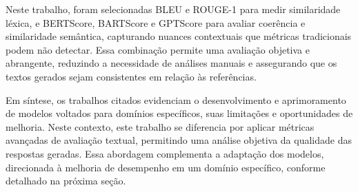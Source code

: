 Neste trabalho, foram selecionadas BLEU e ROUGE-1 para medir similaridade léxica, e BERTScore, BARTScore e GPTScore para avaliar coerência e similaridade semântica, capturando nuances contextuais que métricas tradicionais podem não detectar. Essa combinação permite uma avaliação objetiva e abrangente, reduzindo a necessidade de análises manuais e assegurando que os textos gerados sejam consistentes em relação às referências.

Em síntese, os trabalhos citados evidenciam o desenvolvimento e aprimoramento de modelos voltados para domínios específicos, suas limitações e oportunidades de melhoria. Neste contexto, este trabalho se diferencia por aplicar métricas avançadas de avaliação textual, permitindo uma análise objetiva da qualidade das respostas geradas. Essa abordagem complementa a adaptação dos modelos, direcionada à melhoria de desempenho em um domínio específico, conforme detalhado na próxima seção.
